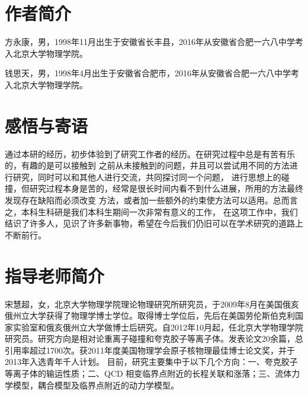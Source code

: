 \documentclass[aps,pre,12pt,preprint,onecolumn,showpacs,showkeys]{revtex4-1}
\begin{document}
\section{\heiti{}作者简介}
方永康，男，1998年11月出生于安徽省长丰县，2016年从安徽省合肥一六八中学考入北京大学物理学院。\par
钱思天，男，1998年4月出生于安徽省合肥市，2016年从安徽省合肥一六八中学考入北京大学物理学院。
\section{\heiti{}感悟与寄语}
通过本研的经历，初步体验到了研究工作者的经历。在研究过程中总是有苦有乐的，有趣的是可以接触到
之前从未接触到的问题，并且可以尝试用不同的方法进行研究，同时可以和其他人进行交流，共同探讨同一个问题，
进行思想上的碰撞，但研究过程本身是苦的，经常是很长时间内看不到什么进展，所用的方法最终发现存在缺陷而必须改变
方法，或者加一些额外的约束使方法可以适用。总而言之，本科生科研是我们本科生期间一次非常有意义的工作，
在这项工作中，我们结识了许多人，见识了许多新事物，希望在今后我们仍旧可以在学术研究的道路上不断前行。

\section{\heiti{}指导老师简介}
宋慧超，女，北京大学物理学院理论物理研究所研究员，于2009年8月在美国俄亥俄州立大学获得了物理学博士学位。取得博士学位后，先后在美国劳伦斯伯克利国家实验室和俄亥俄州立大学做博士后研究。自2012年10月起，任北京大学物理学院研究员。研究方向是相对论重离子碰撞和夸克胶子等离子体。发表论文20余篇，总引用率超过1700次。获2011年度美国物理学会原子核物理最佳博士论文奖，并于2013年入选青年千人计划。
目前，研究主要集中于以下几个方向：一、夸克胶子等离子体的输运性质；二、QCD 相变临界点附近的长程关联和涨落；三、流体力学模型，耦合模型及临界点附近的动力学模型。
\end{document}
